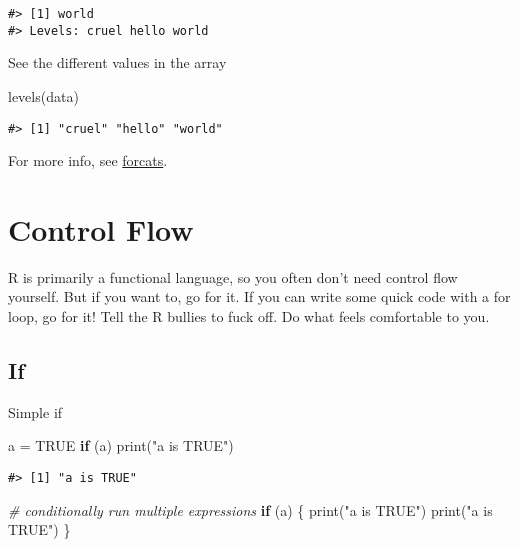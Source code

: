 \documentclass[
]{book}
\newenvironment{Shaded}{\begin{snugshade}}{\end{snugshade}}
\newcommand{\CommentTok}[1]{\textcolor[rgb]{0.56,0.35,0.01}{\textit{#1}}}
\newcommand{\ConstantTok}[1]{\textcolor[rgb]{0.00,0.00,0.00}{#1}}
\newcommand{\ControlFlowTok}[1]{\textcolor[rgb]{0.13,0.29,0.53}{\textbf{#1}}}
\newcommand{\FunctionTok}[1]{\textcolor[rgb]{0.00,0.00,0.00}{#1}}
\newcommand{\NormalTok}[1]{#1}
\newcommand{\OtherTok}[1]{\textcolor[rgb]{0.56,0.35,0.01}{#1}}
\newcommand{\StringTok}[1]{\textcolor[rgb]{0.31,0.60,0.02}{#1}}
\begin{document}
\begin{verbatim}
#> [1] world
#> Levels: cruel hello world
\end{verbatim}

See the different values in the array

\begin{Shaded}
\begin{Highlighting}[]
\FunctionTok{levels}\NormalTok{(data)}
\end{Highlighting}
\end{Shaded}

\begin{verbatim}
#> [1] "cruel" "hello" "world"
\end{verbatim}

For more info, see \href{https://forcats.tidyverse.org/}{forcats}.

\hypertarget{control-flow}{%
\chapter{Control Flow}\label{control-flow}}

R is primarily a functional language, so you often don't need control flow yourself. But if you want to, go for it. If you can write some quick code with a for loop, go for it! Tell the R bullies to fuck off. Do what feels comfortable to you.

\hypertarget{if}{%
\section{If}\label{if}}

Simple if

\begin{Shaded}
\begin{Highlighting}[]
\NormalTok{a }\OtherTok{=} \ConstantTok{TRUE}
\ControlFlowTok{if}\NormalTok{ (a)  }
  \FunctionTok{print}\NormalTok{(}\StringTok{"a is TRUE"}\NormalTok{)}
\end{Highlighting}
\end{Shaded}

\begin{verbatim}
#> [1] "a is TRUE"
\end{verbatim}

\begin{Shaded}
\begin{Highlighting}[]
\CommentTok{\# conditionally run multiple expressions}
\ControlFlowTok{if}\NormalTok{ (a) \{}
  \FunctionTok{print}\NormalTok{(}\StringTok{"a is TRUE"}\NormalTok{)}
  \FunctionTok{print}\NormalTok{(}\StringTok{"a is TRUE"}\NormalTok{)}
\NormalTok{\}}
\end{Highlighting}
\end{Shaded}
\end{document}
